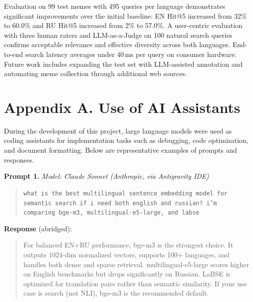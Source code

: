 \documentclass[a4paper,12pt]{article}
\begin{document}
Evaluation on 99 test memes with 495 queries per language demonstrates significant improvements over the initial baseline: EN Hit@5 increased from 32\% to 60.0\% and RU Hit@5 increased from 2\% to 57.0\%. A user-centric evaluation with three human raters and LLM-as-a-Judge on 100 natural search queries confirms acceptable relevance and effective diversity across both languages. End-to-end search latency averages under 40\,ms per query on consumer hardware. Future work includes expanding the test set with LLM-assisted annotation and automating meme collection through additional web sources.

\pagebreak

\appendix
\section*{Appendix A. Use of AI Assistants}

During the development of this project, large language models were used as coding assistants for implementation tasks such as debugging, code optimization, and document formatting. Below are representative examples of prompts and responses.

\bigskip

\noindent\textbf{Prompt 1.} \textit{Model: Claude Sonnet (Anthropic, via Antigravity IDE)}

\begin{quote}
\small
\texttt{what is the best multilingual sentence embedding model for semantic search if i need both english and russian? i'm comparing bge-m3, multilingual-e5-large, and labse}
\end{quote}

\noindent\textbf{Response} (abridged):
\begin{quote}
\small
For balanced EN+RU performance, bge-m3 is the strongest choice. It outputs 1024-dim normalized vectors, supports 100+ languages, and handles both dense and sparse retrieval. multilingual-e5-large scores higher on English benchmarks but drops significantly on Russian. LaBSE is optimized for translation pairs rather than semantic similarity. If your use case is search (not NLI), bge-m3 is the recommended default.
\end{quote}

\bigskip
\end{document}
